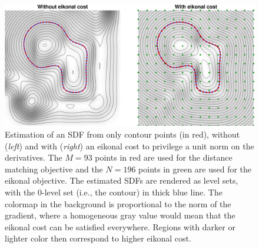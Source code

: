 \documentclass[10pt,a4paper]{article} %
\newcommand{\trsp}{{\scriptscriptstyle\top}}
\begin{document}


\begin{figure}
\centering
\includegraphics[width=.42\textwidth]{images/spline2D_eikonal01.png}
\caption{\footnotesize
Estimation of an SDF from only contour points (in red), without (\emph{left}) and with (\emph{right}) an eikonal cost to privilege a unit norm on the derivatives. The $M\!=\!93$ points in red are used for the distance matching objective and the $N\!=\!196$ points in green are used for the eikonal objective. The estimated SDFs are rendered as level sets, with the 0-level set (i.e., the contour) in thick blue line. The colormap in the background is proportional to the norm of the gradient, where a homogeneous gray value would mean that the eikonal cost can be satisfied everywhere. Regions with darker or lighter color then correspond to higher eikonal cost. 
}
\label{fig:Bezier_2D_eikonal}
\end{figure}
\end{document}
